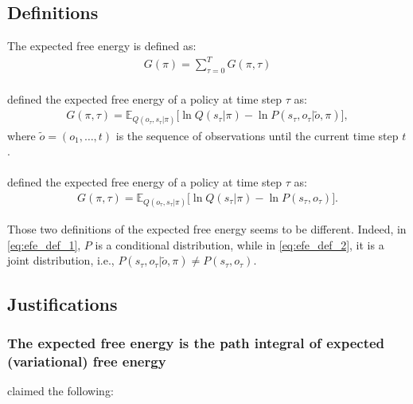 \documentclass[twoside,11pt]{article}
\begin{document}
\subsection{Definitions}

The expected free energy is defined as:
\begin{align*}
G(\pi) = \sum_{\tau=0}^T G(\pi, \tau)
\end{align*}
\\
\citet{FRISTON2016862} defined the expected free energy of a policy at time step $\tau$ as:
\begin{align}
G(\pi, \tau) = \mathbb{E}_{Q(o_\tau, s_\tau|\pi)}\big[\ln Q(s_\tau|\pi) - \ln P(s_\tau, o_\tau|\tilde{o}, \pi)\big],\label{eq:efe_def_1}
\end{align}
where $\tilde{o} = (o_1, \hdots, t)$ is the sequence of observations until the current time step $t$.
\\
\\
\noindent \citet{Parr304782} defined the expected free energy of a policy at time step $\tau$ as:
\begin{align}
G(\pi, \tau) = \mathbb{E}_{Q(o_\tau, s_\tau|\pi)}\big[\ln Q(s_\tau|\pi) - \ln P(s_\tau, o_\tau)\big].\label{eq:efe_def_2}
\end{align}

\begin{myremark}{}{}
Those two definitions of the expected free energy seems to be different. Indeed, in \eqref{eq:efe_def_1}, $P$ is a conditional distribution, while in \eqref{eq:efe_def_2}, it is a joint distribution, i.e., $P(s_\tau, o_\tau|\tilde{o}, \pi) \neq P(s_\tau, o_\tau)$.
\end{myremark}

\subsection{Justifications}

\subsubsection{The expected free energy is the path integral of expected (variational) free energy}

\citet{FRISTON2016862} claimed the following:
\\
\end{document}
